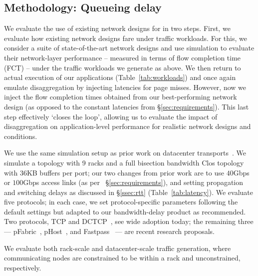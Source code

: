 \vspace{-0.1in}
\subsection{Methodology: Queueing delay}
\label{ssec:ssmethod}
\vspace{-0.05in}
We evaluate the use of existing network designs for \dis in two steps.
First, we evaluate how existing network designs fare under \dis traffic workloads. 
For this, we consider a suite of state-of-the-art network designs and use simulation to evaluate their network-layer performance -- measured in terms of flow completion time (FCT) -- under the traffic workloads we generate as above.
We then return to actual execution of our applications (Table~\ref{tab:workloads}) and once again emulate disaggregation by injecting latencies for page misses. 
However, now we inject the flow completion times obtained from our best-performing network design (as opposed to the constant latencies from \S\ref{sec:requirements}). This last step effectively `closes the loop', allowing us to evaluate the impact of disaggregation on application-level performance for realistic network designs and conditions. 

We use the same simulation setup as prior work on datacenter transports~\cite{pfabric, phost,dctcp}. 
We simulate a %
topology with 9 racks and a full bisection bandwidth Clos topology with $36$KB buffers per port; our two changes from prior work are to use $40$Gbps or $100$Gbps access links (as per ~\S\ref{sec:requirements}), and setting propagation and switching delays as discussed in \S\ref{ssec:rtt} (Table~\ref{tab:latency}).
We evaluate five protocols; in each case, we set protocol-specific parameters following the default settings but adapted to our bandwidth-delay product as recommended. Two protocols, TCP and DCTCP~\cite{dctcp}, see wide adoption today; the remaining three --- pFabric~\cite{pfabric}, pHost~\cite{phost}, and Fastpass~\cite{fastpass} --- are recent research proposals.

We evaluate both rack-scale and datacenter-scale traffic generation, where communicating nodes are constrained to be within a rack and unconstrained, respectively.

\vspace{-0.1in}
